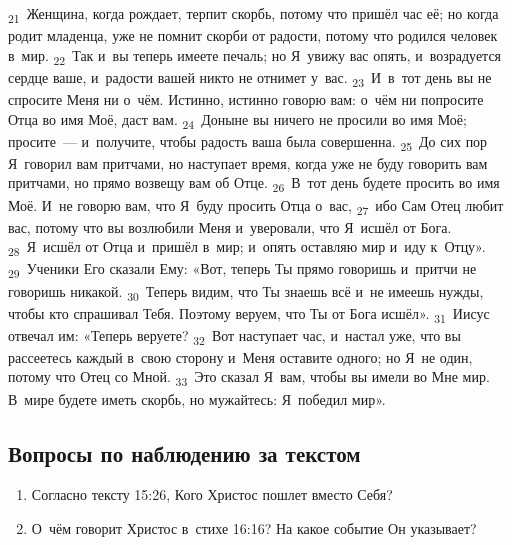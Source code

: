 \documentclass[a4paper,12pt]{article}
\begin{document}
\textsubscript{21}~Женщина, когда рождает, терпит скорбь, потому что пришёл час её; но когда родит младенца, уже не помнит скорби от радости, потому что родился человек в~мир. \textsubscript{22}~Так и~вы теперь имеете печаль; но Я~увижу вас опять, и~возрадуется сердце ваше, и~радости вашей никто не отнимет у~вас. \textsubscript{23}~И~в~тот день вы не спросите Меня ни о~чём. Истинно, истинно говорю вам: о~чём ни попросите Отца во имя Моё, даст вам. \textsubscript{24}~Доныне вы ничего не просили во имя Моё; просите~--- и~получите, чтобы радость ваша была совершенна. \textsubscript{25}~До сих пор Я~говорил вам притчами, но наступает время, когда уже не буду говорить вам притчами, но прямо возвещу вам об Отце. \textsubscript{26}~В~тот день будете просить во имя Моё. И~не говорю вам, что Я~буду просить Отца о~вас, \textsubscript{27}~ибо Сам Отец любит вас, потому что вы возлюбили Меня и~уверовали, что Я~исшёл от Бога. \textsubscript{28}~Я~исшёл от Отца и~пришёл в~мир; и~опять оставляю мир и~иду к~Отцу». \textsubscript{29}~Ученики Его сказали Ему: «Вот, теперь Ты прямо говоришь и~притчи не говоришь никакой. \textsubscript{30}~Теперь видим, что Ты знаешь всё и~не имеешь нужды, чтобы кто спрашивал Тебя. Поэтому веруем, что Ты от Бога исшёл». \textsubscript{31}~Иисус отвечал им: «Теперь веруете? \textsubscript{32}~Вот наступает час, и~настал уже, что вы рассеетесь каждый в~свою сторону и~Меня оставите одного; но Я~не один, потому что Отец со Мной. \textsubscript{33}~Это сказал Я~вам, чтобы вы имели во Мне мир. В~мире будете иметь скорбь, но мужайтесь: Я~победил мир». 

\subsection*{Вопросы по наблюдению за текстом}
\begin{enumerate}
    \item Согласно тексту 15:26, Кого Христос пошлет вместо Себя? 
    
    \myline
    
    \myline
    \item О~чём говорит Христос в~стихе 16:16? На какое событие Он указывает? 
    
    \myline
    
    \myline
\end{enumerate}
\end{document}

